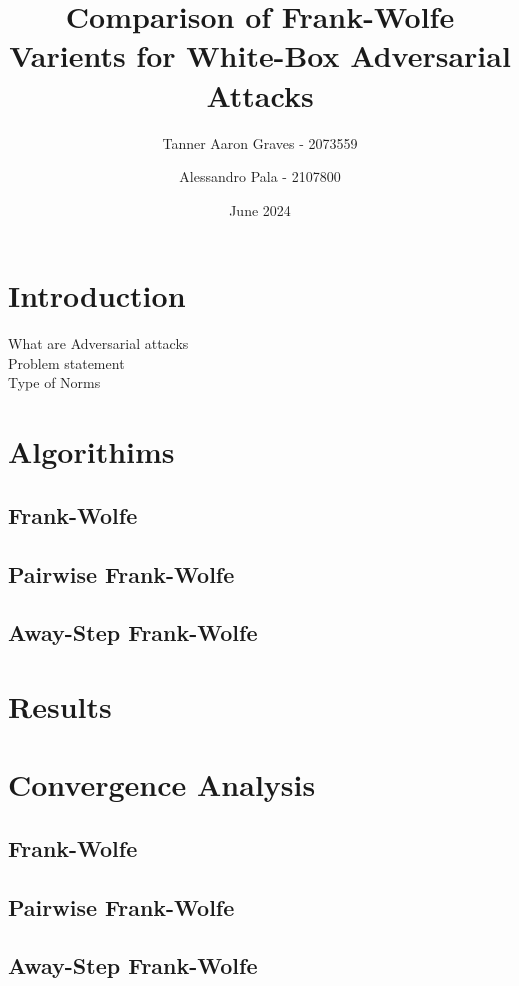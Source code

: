 \documentclass{article}
\title{Comparison of Frank-Wolfe Varients for White-Box Adversarial Attacks}
\author{Tanner Aaron Graves - 2073559\and Alessandro Pala - 2107800}
\date{June 2024}
\begin{document}
\maketitle

\section{Introduction}
What are Adversarial attacks\\
Problem statement\\
Type of Norms

\section{Algorithims}
\subsection{Frank-Wolfe}

\subsection{Pairwise Frank-Wolfe}
\subsection{Away-Step Frank-Wolfe}
\section{Results}
\section{Convergence Analysis}
\subsection{Frank-Wolfe}
\subsection{Pairwise Frank-Wolfe}
\subsection{Away-Step Frank-Wolfe}
\end{document}
